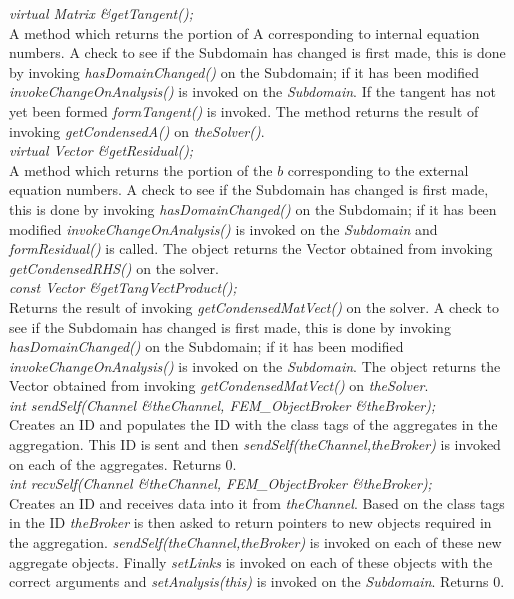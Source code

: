 {\em virtual Matrix \&getTangent();}\\
A method which returns the portion of A corresponding to internal
equation numbers. A check to see if the Subdomain has changed is first made, 
this is done by invoking {\em hasDomainChanged()} on the Subdomain; if it has 
been modified {\em invokeChangeOnAnalysis()} is invoked on the {\em Subdomain}. 
If the tangent has not yet been formed {\em formTangent()} is invoked. 
The method returns the result of invoking {\em getCondensedA()} on {\em theSolver()}. \\


{\em virtual Vector \&getResidual();}\\
A method which returns the portion of the $b$ corresponding
to the external equation numbers. A check to see if the Subdomain has changed is first made, 
this is done by invoking {\em hasDomainChanged()} on the Subdomain; if it has 
been modified {\em invokeChangeOnAnalysis()} is invoked on the {\em Subdomain}
and {\em formResidual()} is called.  The object returns the Vector obtained from 
invoking {\em getCondensedRHS()} on the solver. \\ 


{\em const Vector \&getTangVectProduct();}\\
Returns the result of invoking {\em getCondensedMatVect()} on the
solver. A check to see if the Subdomain has changed is first made, 
this is done by invoking {\em hasDomainChanged()} on the Subdomain; if it has 
been modified {\em invokeChangeOnAnalysis()} is invoked on the {\em Subdomain}. 
The object returns the Vector obtained from invoking {\em getCondensedMatVect()} 
on {\em theSolver}. \\


{\em int sendSelf(Channel \&theChannel, FEM\_ObjectBroker \&theBroker);}\\
Creates an ID and populates the ID with the class tags of the aggregates in
the aggregation. This ID is sent and then {\em sendSelf(theChannel,theBroker)} is
invoked on each of the aggregates. Returns 0.\\

{\em int recvSelf(Channel \&theChannel, FEM\_ObjectBroker \&theBroker);}\\
Creates an ID and receives data into it from {\em theChannel}. Based on the
class tags in the ID {\em theBroker} is then asked to return pointers to
new objects required in the aggregation.  {\em sendSelf(theChannel,theBroker)} is
invoked on each of these new aggregate objects. Finally {\em setLinks} is
invoked on each of these objects with the correct arguments and {\em setAnalysis(this)} 
is invoked on the {\em Subdomain}.  Returns 0.\\


